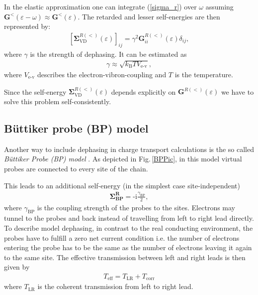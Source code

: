 \documentclass[reprint,superscriptaddress,nofootinbib,amsmath,amssymb,prb,floatfix]{revtex4-1}
\begin{document}
In the elastic approximation one can integrate (\ref{sigma_r}) over $\omega$ assuming $\mathbf{G}^<(\varepsilon - \omega) \approx\mathbf{G}^<(\varepsilon)$. 
The retarded and lesser self-energies are then represented by:
\begin{align}\label{sigma_vd}
\left[\mathbf{\Sigma}_\text{VD}^{R(<)}(\varepsilon)\right]_{ij} = \gamma^2 \mathbf{G}^{R(<)}_{ii}(\varepsilon) \delta_{ij},
\end{align}
where $\gamma$ is the strength of dephasing. It can be estimated as \cite{penazzi_self_2016,
  bihary_dephasing_2005}
\begin{align}\label{gamma_vd}
 \gamma \approx \sqrt{k_\text{B}TV_\text{e-v}},
\end{align}
where $V_\text{e-v}$ describes the electron-vibron-coupling and $T$ is the temperature.

Since the self-energy $\mathbf{\Sigma}_\text{VD}^{R(<)}(\varepsilon)$ depends explicitly on
$\mathbf{G}^{R(<)}(\varepsilon)$ we have to solve this problem self-consistently.

\subsection{B\"uttiker probe (BP) model}
\label{sec_BP}

Another way to include dephasing in charge transport calculations is the so called
\textit{B\"uttiker Probe (BP) model} \cite{buttiker_role_1986, Buttiker1988,
  damato_conductance_1990, Nozaki08jpcc, Nozaki12prb, Chen14jpcl, Venkatramani14faraddis,
  Beratan15accchemres, Kilgour15jcp}.  As depicted in Fig.\,\ref{BPPic}, in this model virtual probes
are connected to every site of the chain.

This leads to an additional self-energy (in the simplest case site-independent)
%
\begin{align}
 \boldsymbol{\Sigma^\text{R}_\text{BP}} = \text{-i}\frac{\gamma_\text{BP}}{2},
\end{align}
%
where $\gamma_\text{BP}$ is the coupling strength of the probes to the sites. Electrons may tunnel
to the probes and back instead of travelling from left to right lead directly. To describe model
dephasing, in contrast to the real conducting environment, the probes have to fulfill a zero net
current condition i.e. the number of electrons entering the probe has to be the same as the number
of electrons leaving it again to the same site.  The effective transmission between left and right
leads is then given by \cite{damato_conductance_1990}
%
\begin{align}
  T_\text{eff} = T_\text{LR} + T_\text{corr}
\end{align}
where $T_\text{LR}$ is the coherent transmission from left to right lead.
\end{document}
